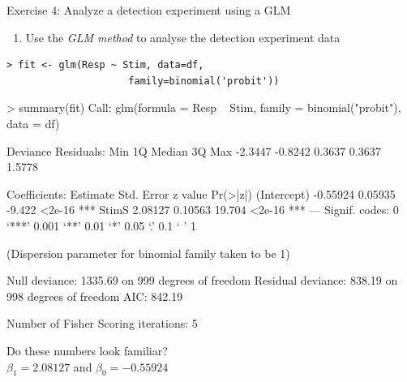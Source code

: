 \documentclass[10pt]{beamer}
\begin{document}
\begin{frame}[fragile]{Exercise 4: Analyze a detection experiment using a GLM}
\begin{enumerate}
\item Use the \textit{GLM method} to analyse the detection experiment data\\
\end{enumerate}

\pause
\begin{verbatim}
> fit <- glm(Resp ~ Stim, data=df, 
                     family=binomial('probit'))
\end{verbatim}
\end{frame}


\begin{frame}[fragile]{}
\begin{verbnobox}[\small]
> summary(fit)
Call:
glm(formula = Resp ~ Stim, family = binomial("probit"), data = df)

Deviance Residuals: 
    Min       1Q   Median       3Q      Max  
-2.3447  -0.8242   0.3637   0.3637   1.5778  

Coefficients:
            Estimate Std. Error z value Pr(>|z|)    
(Intercept) -0.55924    0.05935  -9.422   <2e-16 ***
StimS        2.08127    0.10563  19.704   <2e-16 ***
---
Signif. codes:  0 ‘***’ 0.001 ‘**’ 0.01 ‘*’ 0.05 ‘.’ 0.1 ‘ ’ 1

(Dispersion parameter for binomial family taken to be 1)

    Null deviance: 1335.69  on 999  degrees of freedom
Residual deviance:  838.19  on 998  degrees of freedom
AIC: 842.19

Number of Fisher Scoring iterations: 5
\end{verbnobox}

\begin{center}
Do these numbers look familiar? \\
$\beta_1 = 2.08127$ and $\beta_0 = -0.55924 $
\end{center}
\end{frame}
\end{document}
